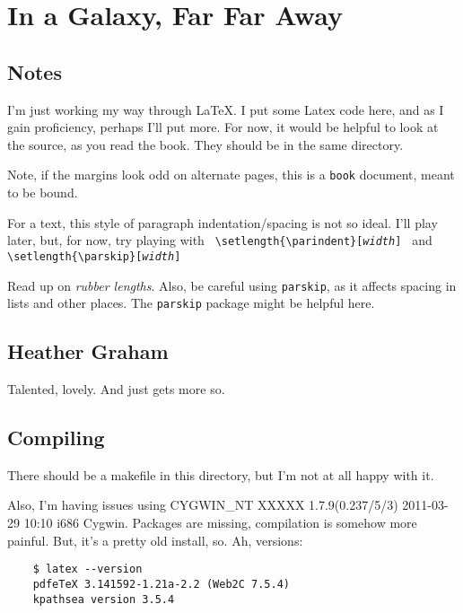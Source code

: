 
\chapter{In a Galaxy, Far Far Away}
\label{starwars} %

\section{Notes}
\label{notes}
%

I'm just working my way through \LaTeX.  I put some Latex code here, and as
I gain proficiency, perhaps I'll put more.  For now, it would be helpful to
look at the source, as you read the book.  They should be in the same
directory.

Note, if the margins look odd on alternate pages, this is a \texttt{book}
document, meant to be bound.

For a text, this style of paragraph indentation/spacing is not so ideal.
I'll play later, but, for now, try playing with \texttt{
\textbackslash{}setlength\{\textbackslash{}parindent\}[\textit{width}] } and
\texttt{
\textbackslash{}setlength\{\textbackslash{}parskip\}[\textit{width}] }

Read up on \emph{rubber lengths}.  Also, be careful using \texttt{parskip}, as
it affects spacing in lists and other places.  The \texttt{parskip} package
might be helpful here.

\section{Heather Graham}
\label{graham}
%
Talented, lovely.  And just gets more so.

\section{Compiling}

There should be a makefile in this directory, but I'm not at all happy with
it.

Also, I'm having issues using CYGWIN\_NT XXXXX 1.7.9(0.237/5/3)
2011-03-29 10:10 i686 Cygwin.  Packages are missing, compilation is somehow
more painful.  But, it's a pretty old install, so.  Ah, versions:

\begin{verbatim}
	$ latex --version
	pdfeTeX 3.141592-1.21a-2.2 (Web2C 7.5.4)
	kpathsea version 3.5.4
\end{verbatim}

